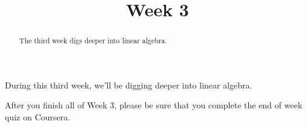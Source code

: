 \documentclass{ximera}
\title{Week 3}
\begin{document}
\begin{abstract}
  The third week digs deeper into linear algebra.
\end{abstract}

During this third week, we'll be digging deeper into linear algebra.

After you finish all of Week 3, please be sure that you complete the
end of week quiz on Coursera.
\end{document}
